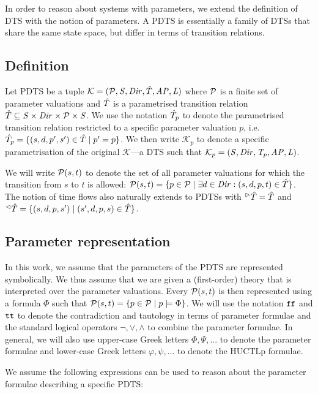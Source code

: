 In order to reason about systems with parameters, we extend the definition of \ac{DTS} with the notion of parameters. A \ac{PDTS} is essentially a family of \acp{DTS} that share the same state space, but differ in terms of transition relations. 

\subsection{Definition}

Let \acl{PDTS} be a tuple $\mathcal{K} = (\mathcal{P}, \mathit{S}, \mathit{Dir}, \hat{T}, \mathit{AP}, \mathit{L})$  where $\mathcal{P}$ is a finite set of parameter valuations and $\hat{T}$ is a parametrised transition relation $\hat{T} \subseteq \mathit{S} \times \mathit{Dir} \times \mathcal{P} \times \mathit{S}$. We use the notation $\hat{T}_p$ to denote the parametrised transition relation restricted to a specific parameter valuation $p$, i.e. $\hat{T}_p = \{ (s, d, p', s') \in \hat{T} \mid p' = p \}$.  We then write $\mathcal{K}_p$ to denote a specific parametrisation of the original $\mathcal{K}$—a \ac{DTS} such that $\mathcal{K}_p = (\mathit{S}, \mathit{Dir}, \mathit{T}_p, \mathit{AP}, \mathit{L})$. 

We will write $\mathcal{P}(s, t)$ to denote the set of all parameter valuations for which the transition from $s$ to $t$ is allowed: $\mathcal{P}(s, t) = \{ p \in \mathcal{P} \mid \exists d \in \mathit{Dir} : (s, d, p, t) \in \hat{T} \}$. The notion of time flows also naturally extends to \acp{PDTS} with ${}^\vartriangleright\hat{T} = \hat{T}$ and ${}^\vartriangleleft\hat{T} = \{ (s, d, p, s') \mid (s', d, p, s) \in \hat{T} \}$.

\subsection{Parameter representation}

In this work, we assume that the parameters of the \ac{PDTS} are represented symbolically. We thus assume that we are given a (first-order) theory that is interpreted over the parameter valuations. Every $\mathcal{P}(s, t)$ is then represented using a formula $\Phi$ such that $\mathcal{P}(s, t) = \{ p \in \mathcal{P} \mid p \models \Phi \}$. We will use the notation $\texttt{ff}$ and $\texttt{tt}$ to denote the contradiction and tautology in terms of parameter formulae and the standard logical operators $\neg, \lor, \land$ to combine the parameter formulae. In general, we will also use upper-case Greek letters $\Phi, \Psi, ...$ to denote the parameter formulae and lower-case Greek letters $\varphi, \psi, ...$ to denote the \ac{HUCTLp} formulae.

We assume the following expressions can be used to reason about the parameter formulae describing a specific \ac{PDTS}:

